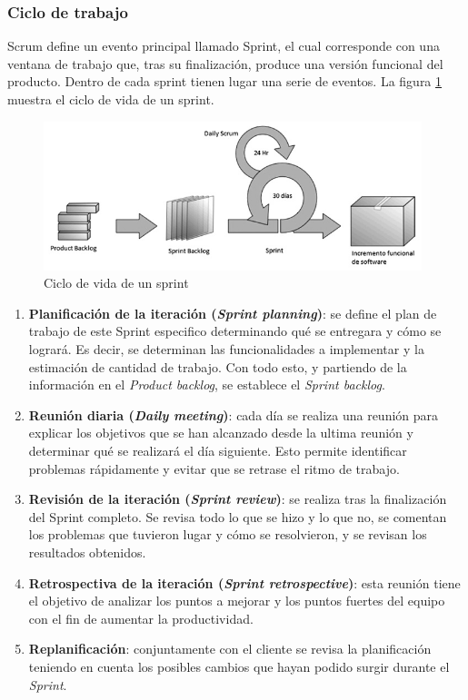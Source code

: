 \subsubsection{Ciclo de trabajo}
	    Scrum define un evento principal llamado Sprint, el cual corresponde con una ventana de trabajo que, tras su finalización, produce una versión funcional del producto. Dentro de cada sprint tienen lugar una serie de eventos. La figura \ref{fig::cicloDeVidaSprint} muestra el ciclo de vida de un sprint. 
	    
\begin{figure}
    \centerline{\includegraphics[width=11cm]{figuras/fasesDeUnSprint.png}}
    \caption{Ciclo de vida de un sprint}
    \label{fig::cicloDeVidaSprint}
\end{figure}

\begin{enumerate}
		\item \textbf{Planificación de la iteración (\textit{Sprint planning})}: se define el plan de trabajo de este Sprint especifico determinando qué se entregara y cómo se logrará. Es decir, se determinan las funcionalidades a implementar y la estimación de cantidad de trabajo. Con todo esto, y partiendo de la información en el \emph{Product backlog}, se establece el \emph{Sprint backlog}.
		\item \textbf{Reunión diaria (\textit{Daily meeting})}: cada día se realiza una reunión para explicar los objetivos que se han alcanzado desde la ultima reunión y determinar qué se realizará el día siguiente. Esto permite identificar problemas rápidamente y evitar que se retrase el ritmo de trabajo. \item \textbf{Revisión de la iteración (\emph{Sprint review})}: se realiza tras la finalización del Sprint completo. Se revisa todo lo que se hizo y lo que no, se comentan los problemas que tuvieron lugar y cómo se resolvieron, y se revisan los resultados obtenidos. 
		\item \textbf{Retrospectiva de la iteración (\emph{Sprint retrospective})}: esta reunión tiene el objetivo de analizar los puntos a mejorar y los puntos fuertes del equipo con el fin de aumentar la productividad.
		\item \textbf{Replanificación}: conjuntamente con el cliente se revisa la planificación teniendo en cuenta los posibles cambios que hayan podido surgir durante el \emph{Sprint}.
\end{enumerate}
			
